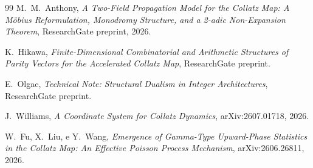\documentclass[11pt]{article}
\begin{document}
\begin{thebibliography}{99}
 M.\ M.\ Anthony, \emph{A Two-Field Propagation
  Model for the Collatz Map: A Möbius Reformulation, Monodromy
  Structure, and a 2-adic Non-Expansion Theorem}, ResearchGate
  preprint, 2026.

 K.\ Hikawa, \emph{Finite-Dimensional Combinatorial
  and Arithmetic Structures of Parity Vectors for the Accelerated
  Collatz Map}, ResearchGate preprint.

 E.\ Olgac, \emph{Technical Note: Structural Dualism
  in Integer Architectures}, ResearchGate preprint.

 J.\ Williams, \emph{A Coordinate System for
  Collatz Dynamics}, arXiv:2607.01718, 2026.

 W.\ Fu, X.\ Liu, e Y.\ Wang, \emph{Emergence of
  Gamma-Type Upward-Phase Statistics in the Collatz Map: An Effective
  Poisson Process Mechanism}, arXiv:2606.26811, 2026.

\end{thebibliography}
\end{document}
